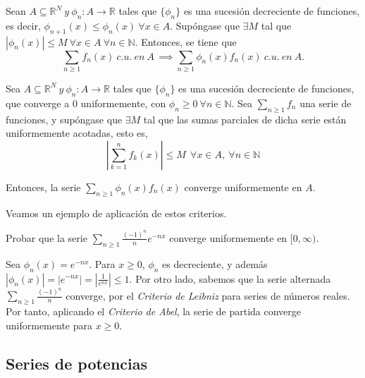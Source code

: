 \begin{nth} \label{11} Sean $ A \subseteq \mathbb{R}^N\  y \ \phi_n : A \rightarrow \mathbb{R}$ tales que $\{\phi_n\}$ es una sucesión decreciente de funciones, es decir, $\phi_{n+1}(x) \leq \phi_n (x)\ \forall x \in A.$ Supóngase que $\exists M$ tal que $|\phi_n (x)| \leq M\ \forall x \in A\ \forall n \in \mathbb{N}.$ Entonces, se tiene que
  $$\sum_{n \ge 1} f_n(x)\ c. u.\ en\ A\, \implies \sum_{n \ge 1} \phi_n(x) f_n(x)\ c. u.\ en\ A.$$
\end{nth}

\begin{nth} \label{12} Sea $A \subseteq \mathbb{R}^N\  y \ \phi_n : A \rightarrow \mathbb{R}$ tales que $\{\phi_n\}$ es una sucesión decreciente de funciones, que converge a 0 uniformemente, con $\phi_n \ge 0 \ \forall n \in \mathbb{N}$. Sea $\sum_{n \ge 1} f_n$ una serie de funciones, y supóngase que $\exists M$ tal que las sumas parciales de dicha serie están uniformemente acotadas, esto es, $$\left| \sum_{k=1}^n f_k(x) \right| \le M \ \ \forall x \in A, \ \forall n \in \mathbb{N}$$

  Entonces, la serie $\displaystyle \sum_{n\ge 1} \phi_n(x)f_n(x)$ converge uniformemente en $A$.

\end{nth}


Veamos un ejemplo de aplicación de estos criterios.

\begin{ejemplo}
  Probar que la serie $\displaystyle \sum_{n \ge 1} \frac{(-1)^n}{n} e^{-nx}$ converge uniformemente en $[0, \infty)$.

  Sea $\phi_n(x) = e^{-nx}$. Para $x \ge 0$, $\phi_n$ es decreciente, y además $|\phi_n(x)| = | e^{-nx} |  = |\frac{1}{e^{nx}} |\le 1$. Por otro lado, sabemos que la serie alternada $ \sum_{n \ge 1} \frac{(-1)^n}{n}$ converge, por el \textit{Criterio de Leibniz} para series de números reales. Por tanto, aplicando el \textit{Criterio de Abel}, la serie de partida converge uniformemente para $x \ge 0$.
\end{ejemplo}



\subsection{Series de potencias}

